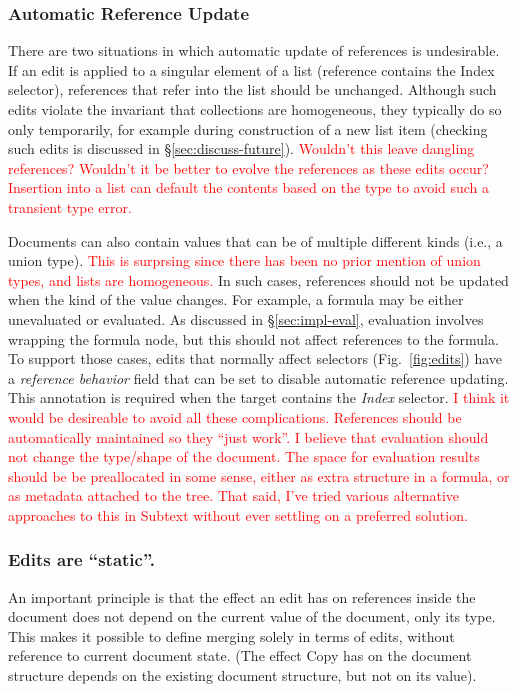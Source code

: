 \documentclass[sigconf,anonymous,screen]{acmart}
\newcommand{\ident}[1]{{\sffamily #1}}
\newcommand{\note}[1]{\textcolor{red}{#1}}
\begin{document}
\subsubsection*{Automatic Reference Update}
There are two situations in which automatic update of references is undesirable. If an edit is
applied to a singular element of a list (reference contains the \ident{Index} selector),
references that refer into the list should be unchanged. Although such edits violate the invariant
that collections are homogeneous, they typically do so only temporarily, for example during
construction of a new list item (checking such edits is discussed in \S\ref{sec:discuss-future}). \note{Wouldn't this leave dangling references? Wouldn't it be better to evolve the references as these edits occur?} \note{Insertion into a list can default the contents based on the type to avoid such a transient type error.}

Documents can also contain values that can be of multiple different kinds (i.e., a union type).
\note{This is surprsing since there has been no prior mention of union types, and lists are homogeneous.}
In such cases, references should not be updated when the kind of the value changes. For example,
a formula may be either unevaluated or evaluated. As discussed in \S\ref{sec:impl-eval}, evaluation
involves wrapping the formula node, but this should not affect references to the formula.
To support those cases, edits that normally affect selectors (Fig.~\ref{fig:edits})
have a \emph{reference behavior} field that can be set to disable automatic reference
updating. This annotation is required when the target contains the \emph{Index} selector.
\note{I think it would be desireable to avoid all these complications. References should be automatically maintained so they ``just work''.}
\note{I believe that evaluation should not change the type/shape of the document. The space for evaluation results should be be preallocated in some sense, either as extra structure in a formula, or as metadata attached to the tree. That said, I've tried various alternative approaches to this in Subtext without ever settling on a preferred solution.}

\subsubsection*{Edits are ``static''.}
An important principle is that the effect an edit has on references inside
the document does not depend on the current value of the document, only its type. This makes it possible to
define merging solely in terms of edits, without reference to current document state.
(The effect \ident{Copy} has on the document structure depends on the existing document
structure, but not on its value).
\end{document}
